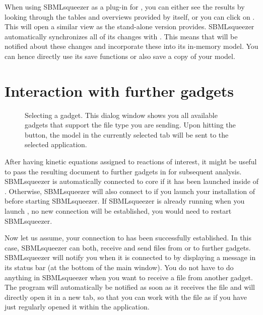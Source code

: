 When using SBMLsqueezer as a plug-in for \CellDesigner, you can either see the results by looking through the tables and overviews provided by \CellDesigner itself, or you can click on . This will open a similar view as the stand-alone version provides.
SBMLsqueezer automatically synchronizes all of its changes with \CellDesigner.
This means that \CellDesigner will be notified about these changes and incorporate these into its in-memory model.
You can hence directly use its save functions or also save a copy of your model.

\section{Interaction with further \Garuda gadgets}
\begin{figure}
\caption[Selecting a \Garuda gadget]{Selecting a \Garuda gadget.
This dialog window shows you all available \Garuda gadgets that support the file type you are sending.
Upon hitting the  button, the model in the currently selected tab will be sent to the selected application.}
\label{fig:SelectGarudaGadget}
\end{figure}

After having kinetic equations assigned to reactions of interest, it might be useful to pass the resulting \SBML document to further gadgets in \Garuda for subsequent analysis.
SBMLsqueezer is automatically connected to \Garuda core if it has been launched inside of \Garuda.
Otherwise, SBMLsqueezer will also connect to \Garuda if you launch your installation of \Garuda before starting SBMLsqueezer.
If SBMLsqueezer is already running when you launch \Garuda, no new connection will be established, you would need to restart SBMLsqueezer.

Now let us assume, your connection to \Garuda has been successfully established.
In this case, SBMLsqueezer can both, receive and send \SBML files from or to further gadgets.
SBMLsqueezer will notify you when it is connected to \Garuda by displaying a message in its status bar (at the bottom of the main window).
You do not have to do anything in SBMLsqueezer when you want to receive a file from another gadget.
The program will automatically be notified as soon as it receives the file and will directly open it in a new tab, so that you can work with the file as if you have just regularly opened it within the application.

